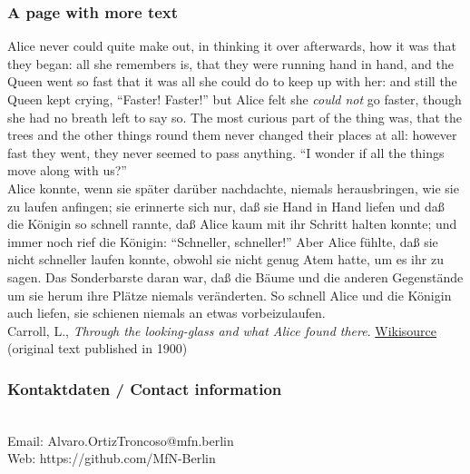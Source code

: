 {\scriptsize
\begin{frame}
  \frametitle{A page with more text}
  Alice never could quite make out, in thinking it over afterwards, how it was that they began: all she remembers is, that they were running hand in hand, and the Queen went so fast that it was all she could do to keep up with her: and still the Queen kept crying, ``Faster! Faster!'' but Alice felt she \textit{could not} go faster, though she had no breath left to say so.
  The most curious part of the thing was, that the trees and the other things round them never changed their places at all: however fast they went, they never seemed to pass anything. ``I wonder if all the things move along with us?''\\
    \bigskip
    \textcolor{mfn_green}{Alice konnte, wenn sie später darüber nachdachte, niemals herausbringen, wie sie zu laufen anfingen; sie erinnerte sich nur, daß sie Hand in Hand liefen und daß die Königin so schnell rannte, daß Alice kaum mit ihr Schritt halten konnte; und immer noch rief die Königin: ``Schneller, schneller!'' Aber Alice fühlte, daß sie nicht schneller laufen konnte, obwohl sie nicht genug Atem hatte, um es ihr zu sagen.
      Das Sonderbarste daran war, daß die Bäume und die anderen Gegenstände um sie herum ihre Plätze niemals veränderten. So schnell Alice und die Königin auch liefen, sie schienen niemals an etwas vorbeizulaufen.}\\
  \bigskip
  \scriptsize{Carroll, L., \textit{Through the looking-glass and what Alice found there}. \href{https://en.wikisource.org/wiki/Through_the_Looking-Glass,_and_What_Alice_Found_There/Chapter_II}{\color{mfn_blue}Wikisource} (original text published in 1900)}  
\end{frame}
}

\begin{frame}
  \frametitle{Kontaktdaten / \textcolor{mfn_green}{Contact information}}
  \begin{center}
    \insertauthor \\
    \medskip
    Email: Alvaro.OrtizTroncoso@mfn.berlin \\    
    \medskip
    Web: https://github.com/MfN-Berlin
  \end{center}
\end{frame}




